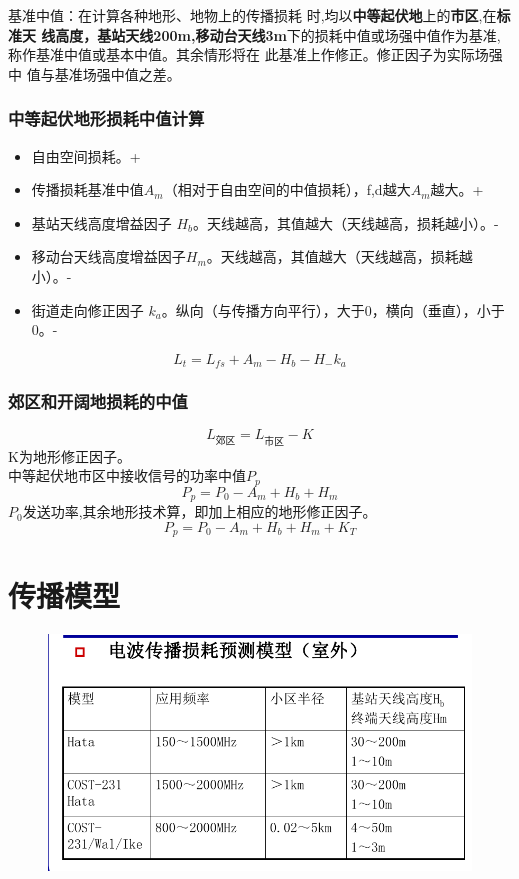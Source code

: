 基准中值：在计算各种地形、地物上的传播损耗
时,均以\textbf{中等起伏地}上的\textbf{市区},在\textbf{标准天
线高度，基站天线200m,移动台天线3m}下的损耗中值或场强中值作为基准,
称作基准中值或基本中值。其余情形将在
此基准上作修正。修正因子为实际场强中
值与基准场强中值之差。

\subsubsection{中等起伏地形损耗中值计算}
\begin{itemize}
	\item 自由空间损耗。+
	\item 传播损耗基准中值$A_m$（相对于自由空间的中值损耗），f,d越大$A_m$越大。+
	\item 基站天线高度增益因子 $ H_b $。天线越高，其值越大（天线越高，损耗越小）。-
	\item 移动台天线高度增益因子$ H_m $。天线越高，其值越大（天线越高，损耗越小）。-
	\item 街道走向修正因子 $ k_a $。纵向（与传播方向平行），大于0，横向（垂直），小于0。-
\end{itemize}
\begin{equation}\label{key}
L_t = L_{fs} + A_m - H_b - H_ -k_a
\end{equation}

\subsubsection{郊区和开阔地损耗的中值
}
\begin{equation}\label{key}
L_{\text{郊区}} = L_{\text{市区}} - K
\end{equation}
K为地形修正因子。\\
中等起伏地市区中接收信号的功率中值$ P_p $
\begin{equation}\label{key}
 P_p = P_0 - A_m + H_b + H_m
\end{equation}
$ P_0 $发送功率,其余地形技术算，即加上相应的地形修正因子。
\begin{equation}\label{key}
 P_p = P_0 - A_m + H_b + H_m+K_T
\end{equation}

\section{传播模型}
\begin{figure}[H]
	\centering
	\includegraphics[width=0.7\linewidth]{figures/chuanbomoxing.png}
	\caption{}
	\label{fig:}
\end{figure}

